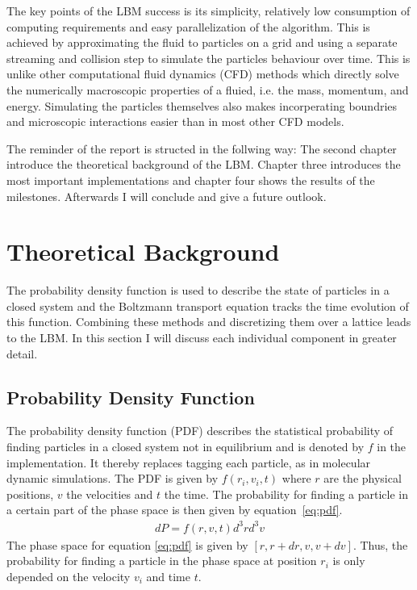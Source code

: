 The key points of the LBM success is its simplicity, relatively low consumption of computing requirements and easy parallelization of the algorithm.
This is achieved by approximating the fluid to particles on a grid and using a separate streaming and collision step to simulate the particles behaviour over time.
This is unlike other computational fluid dynamics (CFD) methods which directly solve the numerically macroscopic properties of a fluied, i.e. the mass, momentum, and energy.
Simulating the particles themselves also makes incorperating boundries and microscopic interactions easier than in most other CFD models.

The reminder of the report is structed in the follwing way: The second chapter introduce the theoretical background of the LBM. Chapter three introduces the most important implementations and chapter four shows the results of the milestones.
Afterwards I will conclude and give a future outlook.

\chapter{Theoretical Background}
The probability density function is used to describe the state of particles in a closed system and the Boltzmann transport equation tracks the time evolution of this function.
Combining these methods and discretizing them over a lattice leads to the LBM.
In this section I will discuss each individual component in greater detail.

\section{Probability Density Function}
The probability density function (PDF) describes the statistical probability of finding particles in a closed system not in equilibrium and is denoted by $f$ in the implementation.
It thereby replaces tagging each particle, as in molecular dynamic simulations.
The PDF is given by $f(r_i,v_i,t)$ where $r$ are the physical positions, $v$ the velocities and $t$ the time.
The probability for finding a particle in a certain part of the phase space is then given by equation~\ref{eq:pdf}.
\begin{equation}
  \label{eq:pdf}
  \begin{aligned}
    dP = f(r,v,t) d^{3}r d^{3}v
  \end{aligned}
\end{equation}
The phase space for equation \ref{eq:pdf} is given by $[r, r+dr, v, v+dv]$.
Thus, the probability for finding a particle in the phase space at position $r_i$ is only depended on the velocity $v_i$ and time $t$.

